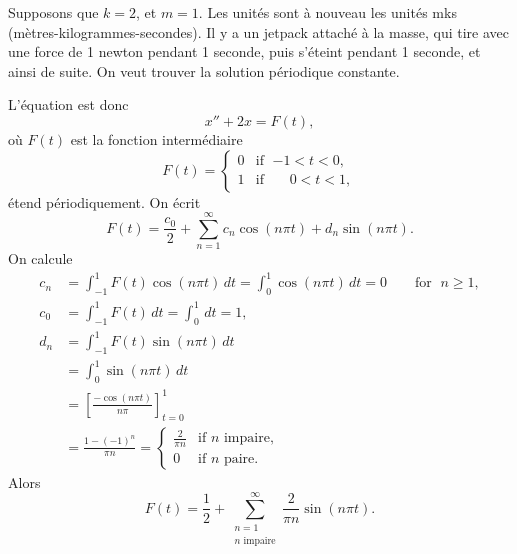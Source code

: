 \begin{example} \label{afs:steadyex}
Supposons que $k=2$, et $m=1$.
Les unités sont à nouveau les unités mks
(mètres-kilogrammes-secondes).
Il y a un jetpack attaché à la masse, qui tire avec une force de 1
newton pendant 1 seconde, puis s'éteint pendant 1 seconde, et ainsi de suite. On veut trouver la solution périodique constante.


L'équation est donc
\begin{equation*}
x'' + 2 x = F(t) ,
\end{equation*}
où $F(t)$ est la fonction intermédiaire
\begin{equation*}
F(t) =
\begin{cases}
0 & \text{if } \; {-1} < t < 0 , \\
1 & \text{if } \; \phantom{-}0 < t < 1 ,
\end{cases}
\end{equation*}
étend périodiquement.
On écrit
\begin{equation*}
F(t) = \frac{c_0}{2} + \sum_{n=1}^\infty
c_n \cos (n \pi t) +
d_n \sin (n \pi t) .
\end{equation*}
On calcule
\begin{align*}
c_n & = \int_{-1}^1 F(t) \cos (n \pi t) \, dt = 
\int_{0}^1 \cos (n \pi t) \, dt = 0 \qquad \text{for } \; n \geq 1,
\\
c_0 & = \int_{-1}^1 F(t) \, dt = 
\int_{0}^1 \, dt = 1 ,
\\
d_n & = \int_{-1}^1 F(t) \sin (n \pi t) \, dt
\\
& = \int_{0}^1 \sin (n \pi t) \, dt
\\
& = \left[ \frac{-\cos (n \pi t)}{n \pi} \right]_{t=0}^1
\\
& = \frac{1-{(-1)}^n}{\pi n} =
\begin{cases}
\frac{2}{\pi n} & \text{if } n \text{ impaire} , \\
0 & \text{if } n \text{ paire} .
\end{cases}
\end{align*}
Alors
\begin{equation*}
F(t) = \frac{1}{2} + \sum_{\substack{n=1 \\ n \text{ impaire}}}^\infty
\frac{2}{\pi n} \sin (n \pi t) .
\end{equation*}


\end{example}
